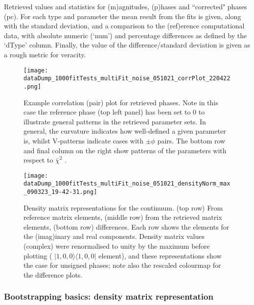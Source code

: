 \documentclass[10pt]{article}
\begin{document}
\begin{table}
\caption{\label{tab:matE}Retrieved values and statistics for (m)agnitudes, (p)hases and ``corrected" phases (pc). For each type and parameter the mean result from the fits is given, along with the standard deviation, and a comparison to the (ref)erence computational data, with absolute numeric (`num') and percentage differences as defined by the `dType' column. Finally, the value of the difference/standard deviation is given as a rough metric for veracity.}
\end{table}

\begin{figure}[]
\begin{center}
\texttt{[image: dataDump\_1000fitTests\_multiFit\_noise\_051021\_corrPlot\_220422.png]}
\caption{Example correlation (pair) plot for retrieved phases. Note in this case the reference phase (top left panel) has been set to 0 to illustrate general patterns in the retrieved parameter sets. In general, the curvature indicates how well-defined a given parameter is, whilst V-patterns indicate cases with \(\pm\phi\) pairs. The bottom row and final column on the right show patterns of the parameters with respect to \(\bar{\chi}^2\) .\label{888108}}
\end{center}
\end{figure}


\begin{figure}[]
\begin{center}
\texttt{[image: dataDump\_1000fitTests\_multiFit\_noise\_051021\_densityNorm\_max\_090323\_19-42-31.png]}
\caption{Density matrix representations for the continuum. (top row) From reference matrix elements, (middle row) from the retrieved matrix elements, (bottom row) differences. Each row shows the elements for the (imag)inary and real components. Density matrix values (complex) were renormalised to unity by the maximum before plotting ( \(|1,0,0\rangle \langle1,0,0|\) element), and these representations show the case for unsigned phases; note also the rescaled colourmap for the difference plots.\label{998904}}
\end{center}
\end{figure}

\subsubsection{Bootstrapping basics: density matrix representation\label{sec:den-mat-N2}}
\end{document}

